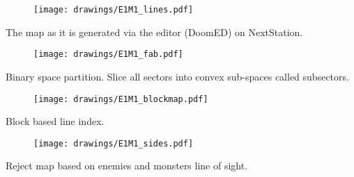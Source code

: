 \par
\begin{figure}[H]
\centering
\texttt{[image: drawings/E1M1\_lines.pdf]}
\end{figure}
\par
The map as it is generated via the editor (DoomED) on NextStation.\\
\par
\begin{figure}[H]
\centering
\texttt{[image: drawings/E1M1\_fab.pdf]}
\end{figure}
\par
Binary space partition. Slice all sectors into convex sub-spaces called subsectors.\\
\par
\begin{figure}[H]
\centering
\texttt{[image: drawings/E1M1\_blockmap.pdf]}
\end{figure}
\par
Block based line index.\\
\par
\begin{figure}[H]
\centering
\texttt{[image: drawings/E1M1\_sides.pdf]}
\end{figure}
\par
Reject map based on enemies and monsters line of sight.\\
